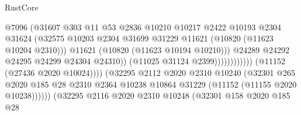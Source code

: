 \begin{lexlean}{RustCore}
\begin{coremodule}
                                                    @7096
                                                    (@31607
                                                      @303
                                                      @11
                                                      @53
                                                      @2836
                                                      @10210
                                                      @10217
                                                      @2422
                                                      @10193
                                                      @2304
                                                      @31624
                                                      (@32575
                                                        @10203
                                                        @2304
                                                        @31699
                                                        @31229
                                                        @11621
                                                        (@10820 (@11623 @10204 @2310)))
                                                      @11621
                                                      (@10820 (@11623 @10194 @10210)))
                                                    @24289
                                                    @24292
                                                    @24295
                                                    @24299
                                                    @24304
                                                    @24310))
                                                (@11025 @31124 @2399))))))))))))
                          (@11152 (@27436 @2020 @10024))))
                      (@32295
                        @2112
                        @2020
                        @2310
                        @10240
                        (@32301
                          @265
                          @2020
                          @185
                          @28
                          @2310
                          @2364
                          @10238
                          @10864
                          @31229
                          (@11152 (@11155 @2020 @10238))))))
                  (@32295
                    @2116
                    @2020
                    @2310
                    @10248
                    (@32301
                      @158
                      @2020
                      @185
                      @28

\end{coremodule}
\end{lexlean}
